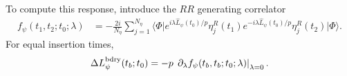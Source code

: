 \documentclass[11pt,a4paper]{article}
\begin{document}
To compute this response, introduce the \(RR\) generating correlator
\begin{equation}
\begin{aligned}
  f_\psi(t_1,t_2;t_0;\lambda)
  &=
  -\frac{2i}{N_\eta}
  \sum_{j=1}^{N_\eta}
  \langle\Phi\rvert
  e^{i\lambda\hat L_\psi(t_0)/p}
  \eta^R_j(t_1)
  e^{-i\lambda\hat L_\psi(t_0)/p}
  \eta^R_j(t_2)
  \lvert\Phi\rangle .
\end{aligned}
\label{eq:S4-generating-correlator}
\end{equation}
For equal insertion times,
\begin{equation}
  \Delta L^{\rm bdry}_\psi(t_b;t_0)
  =
  -p\,
  \left.
  \partial_\lambda
  f_\psi(t_b,t_b;t_0;\lambda)
  \right|_{\lambda=0}.
\label{eq:S4-response-from-generating}
\end{equation}
\end{document}
